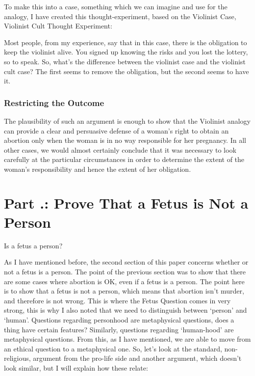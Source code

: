  To make this into a case, something which we can imagine and use for the analogy, I have created this thought-experiment, based on the Violinist Case, Violinist Cult Thought Experiment:


Most people, from my experience, say that in this case, there is the obligation to keep the violinist alive. You signed up knowing the risks and you lost the lottery, so to speak. So, what's the difference between the violinist case and the violinist cult case? The first seems to remove the obligation, but the second seems to have it. 

\subsubsection{Restricting the Outcome}

The plausibility of such an argument is enough to show that the Violinist analogy can provide a clear and persuasive defense of a woman’s right to obtain an abortion only when the woman is in no way responsible for her pregnancy. In all other cases, we would almost certainly conclude that it was necessary to look carefully at the particular circumstances in order to determine the extent of the woman’s responsibility and hence the extent of her obligation.

\section{Part \thechapcount.\theseccount: Prove That a Fetus is Not a Person}
\begin{center}Is a fetus a person?\end{center}

As I have mentioned before, the second section of this paper concerns whether or not a fetus is a person. The point of the previous section was to show that there are some cases where abortion is OK, even if a fetus is a person. The point here is to show that a fetus is not a person, which means that abortion isn't murder, and therefore is not wrong. This is where the Fetus Question comes in very strong, this is why I also noted that we need to distinguish between `person' and `human'. Questions regarding personhood are metaphysical questions, does a thing have certain features? Similarly, questions regarding `human-hood' are metaphysical questions. From this, as I have mentioned, we are able to move from an ethical question to a metaphysical one. So, let's look at the standard, non-religious, argument from the pro-life side and another argument, which doesn't look similar, but I will explain how these relate:


